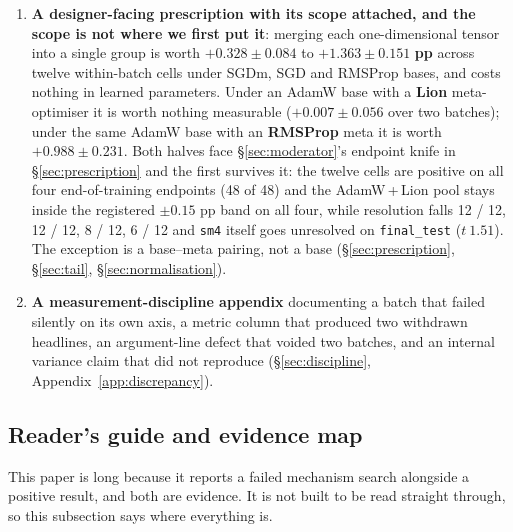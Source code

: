 \documentclass[10pt,letterpaper]{article}
\newcommand{\arm}[1]{\texttt{#1}}
\begin{document}
\begin{enumerate}
{  one not separable, three undecidable by this design --- and two nulls}, reported
  as a section rather than an appendix (\S\ref{sec:mechanisms}), including the identifiability
  limit that makes a tenth unanswerable from this corpus. One of the four refutations is fully
  pre-registered: the bar was committed in the batch script before the runs existed and the
  batch cleared it in the direction the mechanism forbade
  (\S\ref{sec:normalisation}, M9).
\item \textbf{A designer-facing prescription with its scope attached, and the scope is not
  where we first put it}: merging each
  one-dimensional tensor into a single group is worth $\mathbf{+0.328 \pm 0.084}$ to
  $\mathbf{+1.363 \pm 0.151}$ \textbf{pp} across twelve within-batch cells under SGDm, SGD and
  RMSProp bases, and costs nothing in learned parameters. Under an AdamW base with a
  \textbf{Lion} meta-optimiser it is worth nothing measurable ($+0.007 \pm 0.056$ over two
  batches); under the same AdamW base with an \textbf{RMSProp} meta it is worth
  $+0.988 \pm 0.231$. Both halves face \S\ref{sec:moderator}'s endpoint knife in
  \S\ref{sec:prescription} and the first survives it: the twelve cells are positive on all four
  end-of-training endpoints (48 of 48) and the AdamW\,+\,Lion pool stays inside the registered
  $\pm 0.15$ pp band on all four, while resolution falls 12 / 12, 12 / 12, 8 / 12, 6 / 12 and
  \arm{sm4} itself goes unresolved on \texttt{final\_test} ($t\ 1.51$). The exception is a
  base--meta pairing, not a base
  (\S\ref{sec:prescription}, \S\ref{sec:tail}, \S\ref{sec:normalisation}).
\item \textbf{A measurement-discipline appendix} documenting a batch that failed silently on
  its own axis, a metric column that produced two withdrawn headlines, an argument-line defect
  that voided two batches, and an internal variance claim that did not reproduce
  (\S\ref{sec:discipline}, Appendix~\ref{app:discrepancy}).
\end{enumerate}

\subsection{Reader's guide and evidence map}
\label{sec:guide}

This paper is long because it reports a failed mechanism search alongside a positive result, and
both are evidence. It is not built to be read straight through, so this subsection says where
everything is.
\end{document}
